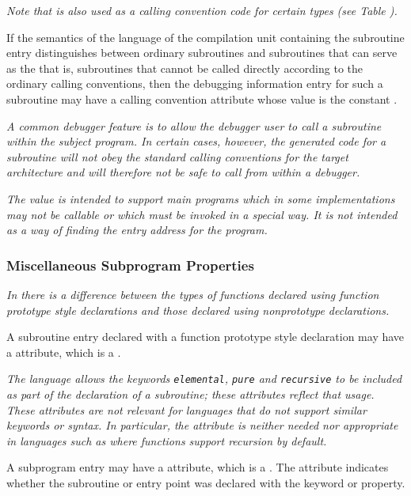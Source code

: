 \textit{Note that \DWCCnormal{} is also used as a calling convention 
code for certain types 
(see Table ).}

If the semantics of the language of the compilation unit
containing the subroutine entry distinguishes between ordinary
subroutines and subroutines that can serve as the  that is, subroutines that cannot be called
directly according to the ordinary calling conventions,
then the debugging information entry for such a subroutine
may have a calling convention attribute whose value is the
constant \DWCCprogramTARG.

\textit{A common debugger feature is to allow the debugger user to call
a subroutine within the subject program. In certain cases,
however, the generated code for a subroutine will not obey
the standard calling conventions for the target architecture
and will therefore not be safe to call from within a debugger.}

\textit{The \DWCCprogram{} 
value is intended to support  main
programs which in some implementations may not be callable
or which must be invoked in a special way. It is not intended
as a way of finding the entry address for the program.}


\subsubsection{Miscellaneous Subprogram Properties}
\textit{In 
there is a difference between the types of functions
declared using function prototype style declarations and
those declared using non\dash prototype declarations.}

A subroutine entry declared with a function prototype style
declaration may have 
a 
\DWATprototypedNAME{} attribute, which is
a \CLASSflag.

\textit{The  
language allows the keywords \texttt{elemental}, \texttt{pure}
and \texttt{recursive} to be included as part of the declaration of
a subroutine; these attributes reflect that usage. These
attributes are not relevant for languages that do not support
similar keywords or syntax. In particular, the \DWATrecursiveNAME{}
attribute is neither needed nor appropriate in languages such
as  
where functions support recursion by default.
}

A subprogram entry 
\hypertarget{chap:DWATelementalelementalpropertyofasubroutine}{}
may have 
a 
\DWATelementalNAME{} attribute, which
is a . 
The attribute indicates whether the subroutine
or entry point was declared with the  keyword
or property.

